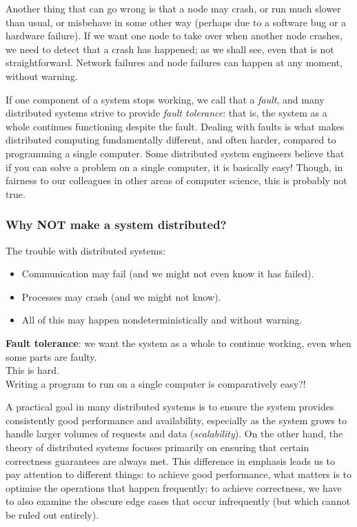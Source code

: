 Another thing that can go wrong is that a node may crash, or run much slower than usual, or misbehave in some other way (perhaps due to a software bug or a hardware failure).
If we want one node to take over when another node crashes, we need to detect that a crash has happened; as we shall see, even that is not straightforward.
Network failures and node failures can happen at any moment, without warning.

If one component of a system stops working, we call that a \emph{fault}, and many distributed systems strive to provide \emph{fault tolerance}: that is, the system as a whole continues functioning despite the fault.
Dealing with faults is what makes distributed computing fundamentally different, and often harder, compared to programming a single computer.
Some distributed system engineers believe that if you can solve a problem on a single computer, it is basically easy!
Though, in fairness to our colleagues in other areas of computer science, this is probably not true.

\begin{frame}
    \label{s:why-not}
    \frametitle{Why NOT make a system distributed?}
    The trouble with distributed systems:
    \begin{itemize}
        \item Communication may fail (and we might not even know it has failed).
        \item Processes may crash (and we might not know).
        \item All of this may happen nondeterministically and without warning.
    \end{itemize}\vspace{1em}\pause
    \textbf{Fault tolerance}: we want the system as a whole to continue working, even when some parts are faulty.\\[1em]
    This is hard.\\[1em]
    Writing a program to run on a single computer is comparatively easy?!
\end{frame}

A practical goal in many distributed systems is to ensure the system provides consistently good performance and availability, especially as the system grows to handle larger volumes of requests and data (\emph{scalability}).
On the other hand, the theory of distributed systems focuses primarily on ensuring that certain correctness guarantees are always met.
This difference in emphasis leads us to pay attention to different things: to achieve good performance, what matters is to optimise the operations that happen frequently; to achieve correctness, we have to also examine the obscure edge cases that occur infrequently (but which cannot be ruled out entirely).


